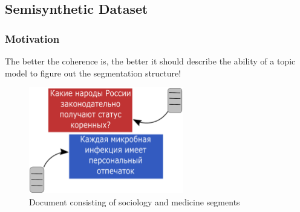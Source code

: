 \documentclass[russian]{beamer}
\begin{document}
\subsection{Semisynthetic Dataset}
\begin{frame}
  \frametitle{Motivation}
  \begin{block}{}
    The better the coherence is, the better it should describe the ability of a topic model to figure out the segmentation structure!
  \end{block}   
  \begin{figure}[h]
    \centering
    \includegraphics[width=0.6\textwidth, height=0.45\textheight]{pn_gen_diagram.eps}
    \caption*{Document consisting of sociology and medicine segments}
  \end{figure}    
\end{frame}
\end{document}
